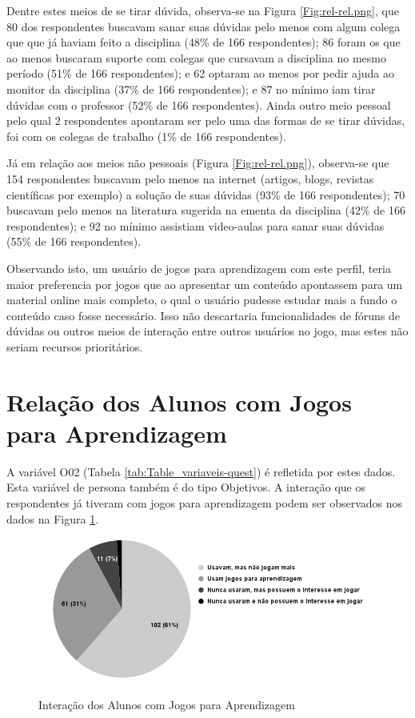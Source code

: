Dentre estes meios de se tirar dúvida, observa-se na Figura \ref{Fig:rel-rel.png}, que 80 dos respondentes buscavam sanar suas dúvidas pelo menos com algum colega que que já haviam feito a disciplina (48\% de 166 respondentes); 86 foram os que ao menos buscaram suporte com colegas que cursavam a disciplina no mesmo período (51\% de 166 respondentes); e 62 optaram ao menos por pedir ajuda ao monitor da disciplina (37\% de 166 respondentes); e 87 no mínimo iam tirar dúvidas com o professor (52\% de 166 respondentes). Ainda outro meio pessoal pelo qual 2 respondentes apontaram ser pelo uma das formas de se tirar dúvidas, foi com os colegas de trabalho (1\% de 166 respondentes).

Já em relação aos meios não pessoais (Figura \ref{Fig:rel-rel.png}), observa-se que 154 respondentes buscavam pelo menos na internet (artigos, blogs, revistas científicas por exemplo) a solução de suas dúvidas (93\% de 166 respondentes); 70 buscavam pelo menos na literatura sugerida na ementa da disciplina (42\% de 166 respondentes); e 92 no mínimo assistiam video-aulas para sanar suas dúvidas (55\% de 166 respondentes).

Observando isto, um usuário de jogos para aprendizagem com este perfil, teria maior preferencia por jogos que ao apresentar um conteúdo apontassem para um material online mais completo, o qual o usuário pudesse estudar mais a fundo o conteúdo caso fosse necessário. Isso não descartaria funcionalidades de fóruns de dúvidas ou outros meios de interação entre outros usuários no jogo, mas estes não seriam recursos prioritários.

\section{Relação dos Alunos com Jogos para Aprendizagem}
\label{sec:rel}

A variável O02 (Tabela \ref{tab:Table_variaveis-quest}) é refletida por estes dados. Esta variável de persona também é do tipo Objetivos. A interação que os respondentes já tiveram com jogos para aprendizagem podem ser observados nos dados na Figura \ref{Fig:uso-jogo.png}.

\begin{figure}[htbp]
	\centering
	\caption{Interação dos Alunos com Jogos para Aprendizagem}
	\includegraphics[keepaspectratio=true,scale=0.575]{figuras/resultados/uso-jogo.png}
	\label{Fig:uso-jogo.png}
\end{figure}

